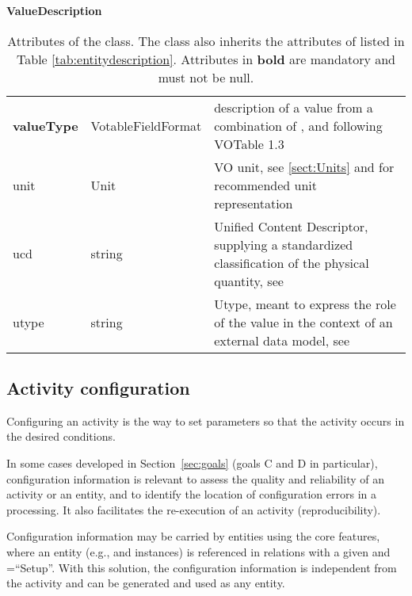 \begin{table}[ht]
\small
{}\textwidth
\textbf{\normalsize ValueDescription}\vspace{0.25em}\\
\begin{tabulary}{1.0\textwidth}{p{2cm}LL}
\toprule
{} &   & \\
\midrule
\textbf{valueType} & VotableFieldFormat & description of a value from a combination of ,  and  following VOTable 1.3 \citep[][, \S4.1]{2013ivoa.spec.0920O} \\
unit        & Unit & VO unit, see \ref{sect:Units} and \citet{2014ivoa.spec.0523D} for recommended unit representation \\
ucd         & string  & Unified Content Descriptor, supplying a standardized classification of the physical quantity, see \citet{2018ivoa.spec.0527M}\\
utype       & string  & Utype, meant to express the role of the value in the context of an external data model, see \citet{note:utypeusage} \\
\bottomrule
\end{tabulary}
\caption[Attributes of the  class]{Attributes of the  class. The class also inherits the attributes of  listed in Table \ref{tab:entitydescription}. Attributes in \textbf{bold} are mandatory and must not be null.}
\label{tab:valuedescription}
\end{table}



\subsection{Activity configuration}
\label{sec:configuration}

Configuring an activity is the way to set parameters so that the activity occurs in the desired conditions.

In some cases developed in Section~\ref{sec:goals} (goals C and D in particular), configuration information is relevant to assess the quality and reliability of an activity or an entity, and to identify the location of configuration errors in a processing. It also facilitates the re-execution of an activity (reproducibility).

Configuration information may be carried by entities using the core features, where an entity (e.g.,  and  instances) is referenced in  relations with a given  and =“Setup”. With this solution, the configuration information is independent from the activity and can be generated and used as any entity.

